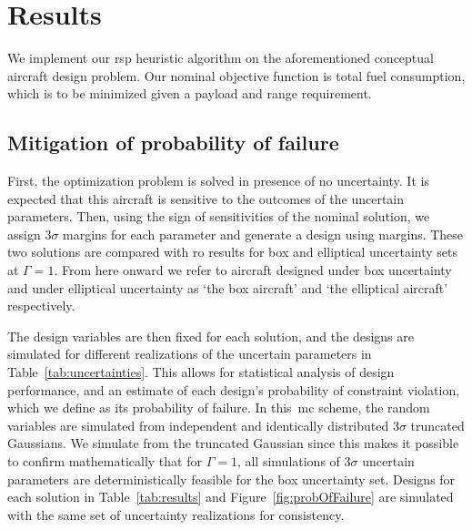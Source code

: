 \section{Results}

We implement our \gls{rsp} heuristic algorithm on the aforementioned conceptual aircraft design problem.
Our nominal objective function is total fuel consumption, which is
to be minimized given a payload and range requirement.

\subsection{Mitigation of probability of failure}

First, the optimization problem is solved in presence of no uncertainty. It is expected
that this aircraft is sensitive to the outcomes of the uncertain parameters. Then, using the sign of
sensitivities of the nominal solution, we assign $3\sigma$ margins for each parameter
and generate a design using margins. These two solutions are compared with \gls{ro} results for
box and elliptical uncertainty sets at $\Gamma = 1$. From here onward we refer to
aircraft designed under box uncertainty and
under elliptical uncertainty as `the box aircraft' and `the elliptical aircraft' respectively.

The design variables are then fixed for each solution, and the designs are simulated for
different realizations of the uncertain parameters in Table~\ref{tab:uncertainties}.
This allows for statistical analysis of design performance, and
an estimate of each design's probability of constraint
violation, which we define as its probability of failure.
In this~\gls{mc} scheme, the random variables
are simulated from independent and identically distributed $3\sigma$ truncated Gaussians.
We simulate from the truncated Gaussian since this makes it possible to
confirm mathematically that for $\Gamma = 1$, all simulations of $3\sigma$ uncertain parameters are
deterministically feasible for the box uncertainty set.
Designs for each solution in Table~\ref{tab:results} and Figure~\ref{fig:probOfFailure}
are simulated with the same set of uncertainty realizations for consistency.

